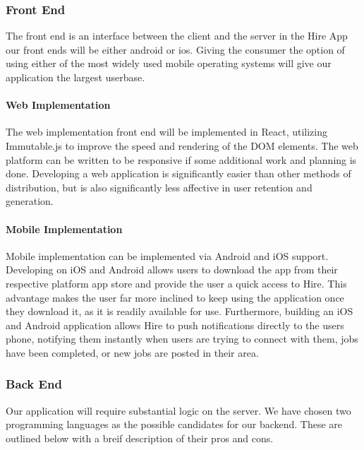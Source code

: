 \documentclass[11pt]{article}
\begin{document}
\subsubsection{Front End}

The front end is an interface between the \gls{client} and the \gls{server} in the Hire App our front ends will be either \gls{android} or \gls{ios}. Giving the consumer the option of using either of the most widely used mobile operating systems will give our application the largest userbase.

\paragraph{Web Implementation}
\hfill \break

The web implementation front end will be implemented in React, utilizing Immutable.js to improve the speed and rendering of the DOM elements. The web platform can be written to be \gls{responsive} if some additional work and planning is done. Developing a web application is significantly easier than other methods of distribution, but is also significantly less affective in user retention and generation.

\paragraph{Mobile Implementation}
\hfill \break

Mobile implementation can be implemented via Android and iOS support. Developing on iOS and Android allows users to download the app from their respective platform app store and provide the user a quick access to Hire. This advantage makes the user far more inclined to keep using the application once they download it, as it is readily available for use. Furthermore, building an iOS and Android application allows Hire to push notifications directly to the users phone, notifying them instantly when users are trying to connect with them, jobs have been completed, or new jobs are posted in their area.

\subsubsection{Back End}

Our application will require substantial logic on the \gls{server}. We have chosen two programming languages as the possible candidates for our backend. These are outlined below with a breif description of their pros and cons.
\end{document}
